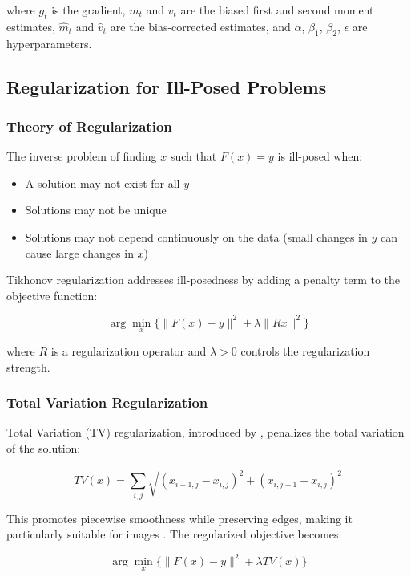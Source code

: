 \documentclass[nomenclature, english, bibtex]{kththesis}
\numberwithin{listing}{chapter}
\begin{document}
where $g_t$ is the gradient, $m_t$ and $v_t$ are the biased first and second moment estimates, $\hat{m}_t$ and $\hat{v}_t$ are the bias-corrected estimates, and $\alpha$, $\beta_1$, $\beta_2$, $\epsilon$ are hyperparameters.

\subsection{Regularization for Ill-Posed Problems}
\subsubsection{Theory of Regularization}
The inverse problem of finding $x$ such that $F(x) = y$ is ill-posed when:
\begin{itemize}
    \item A solution may not exist for all $y$
    \item Solutions may not be unique
    \item Solutions may not depend continuously on the data (small changes in $y$ can cause large changes in $x$)
\end{itemize}

Tikhonov regularization \cite{tikhonov1977solutions} addresses ill-posedness by adding a penalty term to the objective function:

\begin{equation}
\arg\min_x \{\|F(x) - y\|^2 + \lambda \|Rx\|^2\}
\end{equation}

where $R$ is a regularization operator and $\lambda > 0$ controls the regularization strength.

\subsubsection{Total Variation Regularization}
Total Variation (TV) regularization, introduced by \cite{rudin1992nonlinear}, penalizes the total variation of the solution:

\begin{equation}
TV(x) = \sum_{i,j} \sqrt{(x_{i+1,j} - x_{i,j})^2 + (x_{i,j+1} - x_{i,j})^2}
\end{equation}

This promotes piecewise smoothness while preserving edges, making it particularly suitable for images \cite{chambolle2004algorithm}. The regularized objective becomes:

\begin{equation}
\arg\min_x \{\|F(x) - y\|^2 + \lambda TV(x)\}
\end{equation}
\end{document}
